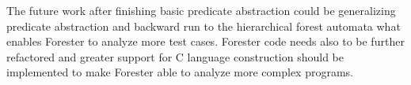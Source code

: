 \documentclass[fleqn,11pt]{ExcelAtFIT} %
\begin{document}
The future work after finishing basic predicate abstraction could be generalizing predicate abstraction and backward run to the hierarchical forest automata
what enables Forester to analyze more test cases.
Forester code needs also to be further refactored and greater support for C language construction should be implemented to make Forester able
to analyze more complex programs.







\end{document}
